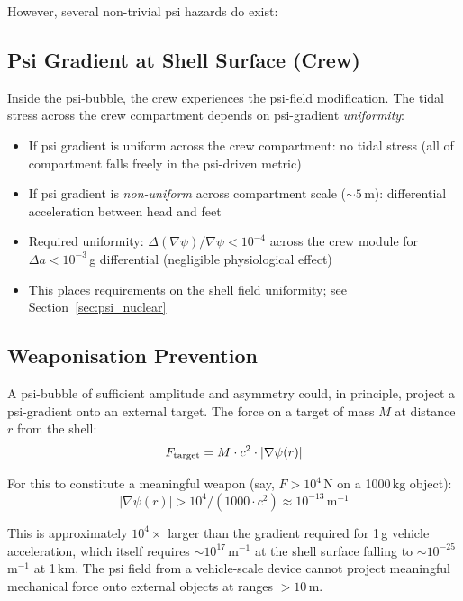 \documentclass[11pt,a4paper]{article}
\begin{document}
However, several non-trivial psi hazards do exist:

\subsection{Psi Gradient at Shell Surface (Crew)}

Inside the psi-bubble, the crew experiences the psi-field modification.
The tidal stress across the crew compartment depends on psi-gradient
\textit{uniformity}:
\begin{itemize}
  \item If psi gradient is uniform across the crew compartment: no tidal
    stress (all of compartment falls freely in the psi-driven metric)
  \item If psi gradient is \textit{non-uniform} across compartment scale
    ($\sim 5$\,m): differential acceleration between head and feet
  \item Required uniformity: $\Delta(\nabla\psi)/\nabla\psi < 10^{-4}$
    across the crew module for $\Delta a < 10^{-3}$\,g differential
    (negligible physiological effect)
  \item This places requirements on the shell field uniformity;
    see Section~\ref{sec:psi_nuclear}
\end{itemize}

\subsection{Weaponisation Prevention}

A psi-bubble of sufficient amplitude and asymmetry could, in principle,
project a psi-gradient onto an external target. The force on a target
of mass $M$ at distance $r$ from the shell:
\begin{equation}
  F_{\rm target} = M \cdot c^2 \cdot |\nabla\psi(r)|
\end{equation}

For this to constitute a meaningful weapon (say, $F > 10^4$\,N on
a 1000\,kg object):
\begin{equation}
  |\nabla\psi(r)| > 10^4 / (1000 \cdot c^2) \approx 10^{-13}\,\text{m}^{-1}
\end{equation}

This is approximately $10^4\times$ larger than the gradient required
for 1\,g vehicle acceleration, which itself requires $\sim 10^{17}$\,m$^{-1}$
at the shell surface falling to $\sim 10^{-25}$\,m$^{-1}$ at 1\,km.
The psi field from a vehicle-scale device cannot project meaningful
mechanical force onto external objects at ranges $> 10$\,m.
\end{document}
